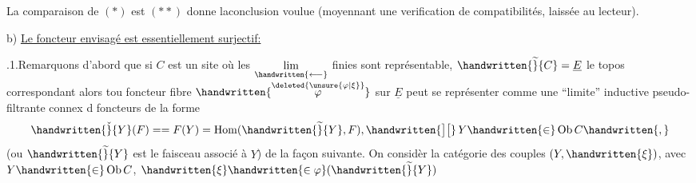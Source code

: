 \noindent La comparaison de $(*)$ est $(**)$ donne la\handwritten{$\mid$}conclusion voulue (moyennant une verification de compatibilités, laissée au lecteur).

\noindent{}%
b) \uline{Le foncteur envisagé est essentiellement surjectif:}

.1.\quad Remarquons d'abord que si $C$ est un site où les $\mathop{\underset{\handwritten{\longleftarrow}}{\mathrm{lim}}}\limits$ finies sont représentable, $\handwritten{\widetilde}{C} = \underline{E}$ le topos correspondant alors\handwritten{,} tou%
foncteur fibre $\handwritten{\overset{\deleted{\unsure{\varphi|\xi}}}{\varphi}}$ sur $\underline E$ peut se représenter comme une ``limite''
\margin{\handwritten{$/\quad /\quad\varphi$}}
inductive pseudo-filtrante connex d foncteurs de la forme
\margin{\handwritten{$]\,[ $}}
\[
\handwritten{\check}{Y}(F) == F(Y) = \operatorname{Hom}(\handwritten{\widetilde}{Y},F),\handwritten{\big]\big[}\, Y\handwritten{\in}\operatorname{Ob} C\handwritten{,}
\]
(ou $\handwritten{\widetilde}{Y}$ est le faisceau associé à $Y$)\handwritten{,} de la façon suivante. On considèr
\margin{\handwritten{,}}
la catégorie des couples $(Y,\handwritten{\xi})$, avec $Y\handwritten{\in}\operatorname{Ob} C$, $\handwritten{\xi}\handwritten{\in\varphi}(\handwritten{\widetilde}{Y})$
\endgroup

\clearpage
